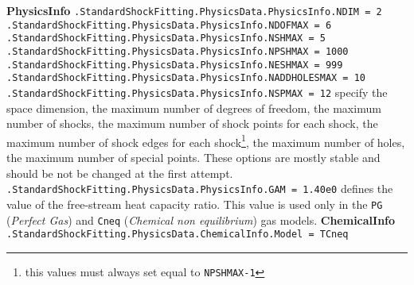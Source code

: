 \documentclass[11pt,a4paper,oneside]{article}
\begin{document}
\textbf{PhysicsInfo}
\newline
\newline
\hspace*{1cm} \texttt{.StandardShockFitting.PhysicsData.PhysicsInfo.NDIM = 2}
\newline
\hspace*{1cm} \texttt{.StandardShockFitting.PhysicsData.PhysicsInfo.NDOFMAX = 6}
\newline
\hspace*{1cm} \texttt{.StandardShockFitting.PhysicsData.PhysicsInfo.NSHMAX = 5}
\newline
\hspace*{1cm} \texttt{.StandardShockFitting.PhysicsData.PhysicsInfo.NPSHMAX = 1000}
\newline
\hspace*{1cm} \texttt{.StandardShockFitting.PhysicsData.PhysicsInfo.NESHMAX = 999}
\newline
\hspace*{1cm} \texttt{.StandardShockFitting.PhysicsData.PhysicsInfo.NADDHOLESMAX = 10}
\newline
\hspace*{1cm} \texttt{.StandardShockFitting.PhysicsData.PhysicsInfo.NSPMAX = 12}
\newline
\newline
specify the space dimension, the maximum number of degrees of freedom, the maximum number of shocks, the maximum number of shock points for each shock, the maximum number of shock edges for each shock\footnote{this values must always set equal to \texttt{NPSHMAX-1}}, the maximum number of holes, the maximum number of special points.
\newline
These options are mostly stable and should be not be changed at the first attempt.
\newline
\newline
\hspace*{1cm} \texttt{.StandardShockFitting.PhysicsData.PhysicsInfo.GAM = 1.40e0}
\newline
\newline
defines the value of the free-stream heat capacity ratio. This value is used only in the \texttt{PG} (\textit{Perfect Gas}) and \texttt{Cneq} (\textit{Chemical non equilibrium}) gas models.
\newline
\newline
\textbf{ChemicalInfo}
\newline
\newline
\hspace*{1cm} \texttt{.StandardShockFitting.PhysicsData.ChemicalInfo.Model = TCneq}
\end{document}
